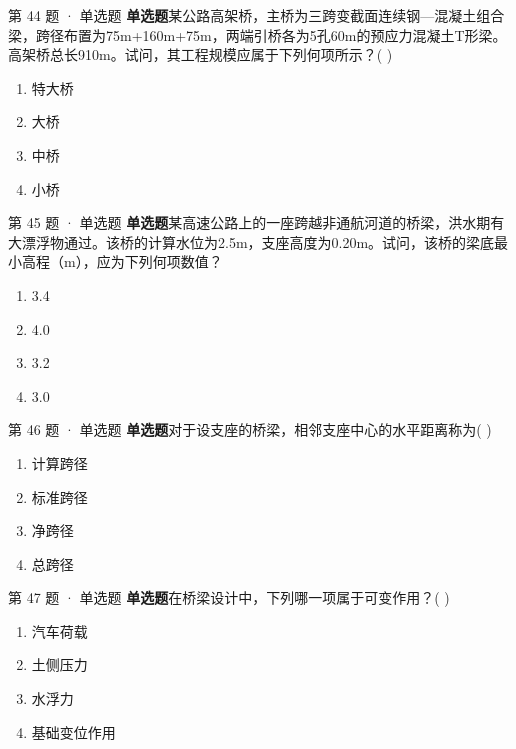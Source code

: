 \documentclass[UTF8,zihao=-4,openany]{ctexbook}
\newenvironment{choices}{\begin{enumerate}[label=\Alph*.,leftmargin=9mm,labelsep=3mm,itemsep=2pt,topsep=4pt]}{\end{enumerate}}
\newcommand{\qtype}[1]{\textcolor{brand}{\sffamily\bfseries #1}}
\begin{document}
\begin{questionbox}{第 44 题 · 单选题}
\qtype{单选题}\quad 某公路高架桥，主桥为三跨变截面连续钢—混凝土组合梁，跨径布置为75m+160m+75m，两端引桥各为5孔60m的预应力混凝土T形梁。高架桥总长910m。试问，其工程规模应属于下列何项所示？( )
\begin{choices}
\item 特大桥
\item 大桥
\item 中桥
\item 小桥
\end{choices}
\end{questionbox}

\begin{questionbox}{第 45 题 · 单选题}
\qtype{单选题}\quad 某高速公路上的一座跨越非通航河道的桥梁，洪水期有大漂浮物通过。该桥的计算水位为2.5m，支座高度为0.20m。试问，该桥的梁底最小高程（m），应为下列何项数值？
\begin{choices}
\item 3.4
\item 4.0
\item 3.2
\item 3.0
\end{choices}
\end{questionbox}

\begin{questionbox}{第 46 题 · 单选题}
\qtype{单选题}\quad 对于设支座的桥梁，相邻支座中心的水平距离称为( )
\begin{choices}
\item 计算跨径
\item 标准跨径
\item 净跨径
\item 总跨径
\end{choices}
\end{questionbox}

\begin{questionbox}{第 47 题 · 单选题}
\qtype{单选题}\quad 在桥梁设计中，下列哪一项属于可变作用？( )
\begin{choices}
\item 汽车荷载
\item 土侧压力
\item 水浮力
\item 基础变位作用
\end{choices}
\end{questionbox}
\end{document}
